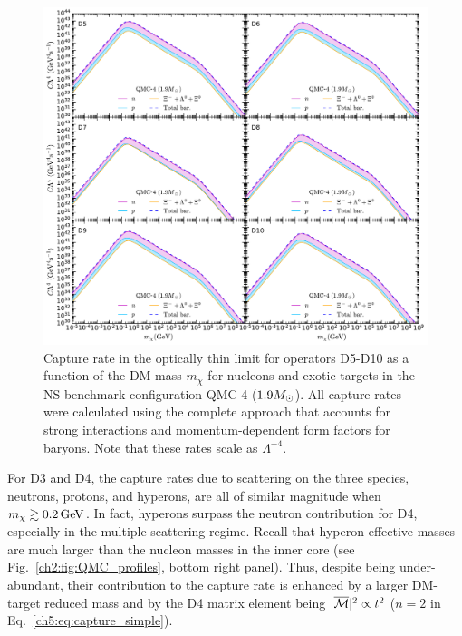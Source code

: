 \begin{figure}[t!bp] 
\centering
\includegraphics[width=\textwidth]{capture_3/D5_D10_C_mDM_hyper_meff.pdf}
\caption[Capture rate in the optically thin limit for operators D5-D10 as a function of the DM mass $m_\chi$ for nucleons and exotic targets in the NS benchmark configuration QMC-4 ($1.9\Msun$).]{Capture rate in the optically thin limit for operators D5-D10 as a function of the DM mass $m_\chi$ for nucleons and exotic targets in the NS benchmark configuration QMC-4 ($1.9\Msun$). All capture rates were calculated using the complete approach that accounts for strong interactions and momentum-dependent form factors for baryons. Note that these rates scale as $\Lambda^{-4}$. 
}
\label{ch5:fig:capratesD5D10_Hyper}
\end{figure}  

For D3 and D4, the capture rates due to scattering on the three species, neutrons, protons, and hyperons, are all of similar magnitude when $m_\chi\gtrsim0.2{\rm \,GeV}$. In fact, hyperons surpass the neutron contribution for D4, especially in the multiple scattering regime.  Recall that hyperon effective masses are much larger than the nucleon masses in the inner core (see Fig.~\ref{ch2:fig:QMC_profiles}, bottom right panel). Thus, despite being under-abundant, their contribution to the capture rate is enhanced by a larger DM-target reduced mass and by the D4 matrix element being $|\overline{\mathcal M}|^2\propto t^2$ ($n=2$ in  Eq.~\ref{ch5:eq:capture_simple}). 

